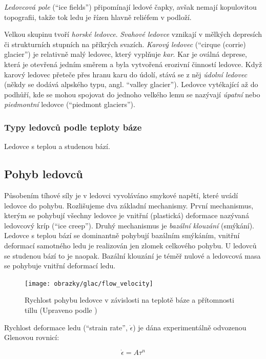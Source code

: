 \emph{Ledovcová pole} (\enquote{ice fields}) připomínají ledové čapky, avšak nemají kopulovitou topografii, takže tok ledu je řízen hlavně reliéfem v podloží.

Velkou skupinu tvoří \emph{horské ledovce}. \emph{Svahové ledovce} vznikají v mělkých depresích či strukturních stupních na příkrých svazích. \emph{Karový ledovec} (\enquote{cirque (corrie) glacier}) je relativně malý ledovec, který vyplňuje \emph{kar}. Kar je oválná deprese, která je otevřená jedním směrem a byla vytvořená erozivní činností ledovce. Když karový ledovec přeteče přes hranu karu do údolí, stává se z něj \emph{údolní ledovec} (někdy se dodává alpského typu, angl. \enquote{valley glacier}). Ledovce vytékající až do podhůří, kde se mohou spojovat do jednoho velkého lemu se nazývají \emph{úpatní} nebo \emph{piedmontní} ledovce (\enquote{piedmont glaciers}).

\subsubsection{Typy ledovců podle teploty báze}
Ledovce s teplou a studenou bází.

\subsection{Pohyb ledovců}
Působením tíhové síly je v ledovci vyvoláváno smykové napětí, které uvádí ledovce do pohybu. Rozlišujeme dva základní mechanismy. První mechanismus, kterým se pohybují všechny ledovce je vnitřní (plastická) deformace nazývaná ledovcový kríp (\enquote{ice creep}). Druhý mechanismus je \emph{bazální klouzání} (smýkání). Ledovce s teplou bází se dominantně pohybují bazálním smýkáním, vnitřní deformací samotného ledu je realizován jen zlomek celkového pohybu. U ledovců se studenou bází to je naopak. Bazální klouzání je téměř nulové a ledovcová masa se pohybuje vnitřní deformací ledu. 

\begin{figure}
	\centering
	\texttt{[image: obrazky/glac/flow\_velocity]}
	\caption{Rychlost pohybu ledovce v závislosti na teplotě báze a přítomnosti tillu (Upraveno podle \textcite{biermanKeyConceptsGeomorphology2014})}
	\label{fig:flowvelocity}
\end{figure}

Rychlost deformace ledu (\enquote{strain rate}, $\dot{\epsilon}$) je dána experimentálně odvozenou Glenovou rovnicí:

\begin{equation}
	\dot{\epsilon} = A\tau^{n}
\end{equation}

